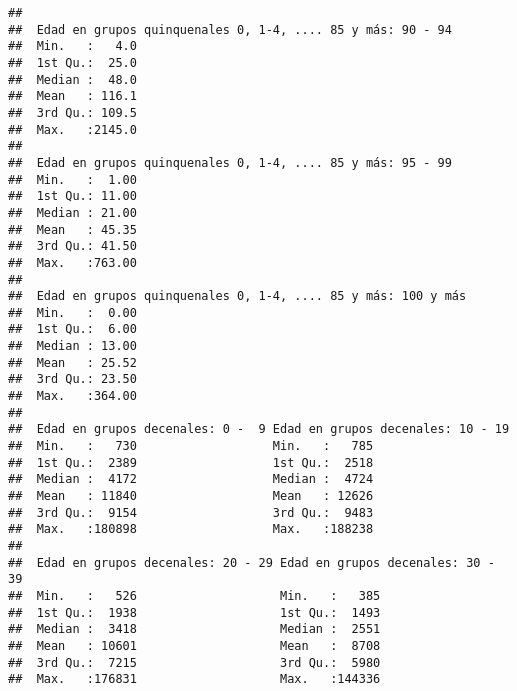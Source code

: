 \documentclass[11pt,]{article}
\begin{document}
\begin{verbatim}
##                                                            
##  Edad en grupos quinquenales 0, 1-4, .... 85 y más: 90 - 94
##  Min.   :   4.0                                            
##  1st Qu.:  25.0                                            
##  Median :  48.0                                            
##  Mean   : 116.1                                            
##  3rd Qu.: 109.5                                            
##  Max.   :2145.0                                            
##                                                            
##  Edad en grupos quinquenales 0, 1-4, .... 85 y más: 95 - 99
##  Min.   :  1.00                                            
##  1st Qu.: 11.00                                            
##  Median : 21.00                                            
##  Mean   : 45.35                                            
##  3rd Qu.: 41.50                                            
##  Max.   :763.00                                            
##                                                            
##  Edad en grupos quinquenales 0, 1-4, .... 85 y más: 100 y más
##  Min.   :  0.00                                              
##  1st Qu.:  6.00                                              
##  Median : 13.00                                              
##  Mean   : 25.52                                              
##  3rd Qu.: 23.50                                              
##  Max.   :364.00                                              
##                                                              
##  Edad en grupos decenales: 0 -  9 Edad en grupos decenales: 10 - 19
##  Min.   :   730                   Min.   :   785                   
##  1st Qu.:  2389                   1st Qu.:  2518                   
##  Median :  4172                   Median :  4724                   
##  Mean   : 11840                   Mean   : 12626                   
##  3rd Qu.:  9154                   3rd Qu.:  9483                   
##  Max.   :180898                   Max.   :188238                   
##                                                                    
##  Edad en grupos decenales: 20 - 29 Edad en grupos decenales: 30 - 39
##  Min.   :   526                    Min.   :   385                   
##  1st Qu.:  1938                    1st Qu.:  1493                   
##  Median :  3418                    Median :  2551                   
##  Mean   : 10601                    Mean   :  8708                   
##  3rd Qu.:  7215                    3rd Qu.:  5980                   
##  Max.   :176831                    Max.   :144336                   

\end{verbatim}
\end{document}
